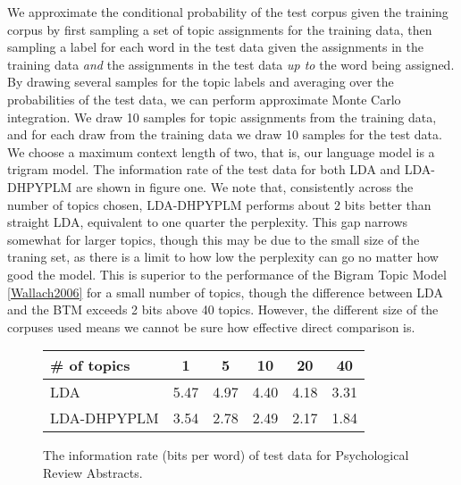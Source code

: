 We approximate the conditional probability of the test corpus given the training corpus by first sampling a set of topic assignments for the training data, then sampling a label for each word in the test data given the assignments in the training data \textit{and} the assignments in the test data \textit{up to} the word being assigned.  By drawing several samples for the topic labels and averaging over the probabilities of the test data, we can perform approximate Monte Carlo integration.  We draw 10 samples for topic assignments from the training data, and for each draw from the training data we draw 10 samples for the test data.  We choose a maximum context length of two, that is, our language model is a trigram model.  The information rate of the test data for both LDA and LDA-DHPYPLM are shown in figure one.  We note that, consistently across the number of topics chosen, LDA-DHPYPLM performs about 2 bits better than straight LDA, equivalent to one quarter the perplexity.  This gap narrows somewhat for larger topics, though this may be due to the small size of the traning set, as there is a limit to how low the perplexity can go no matter how good the model.  This is superior to the performance of the Bigram Topic Model \ref{Wallach2006} for a small number of topics, though the difference between LDA and the BTM exceeds 2 bits above 40 topics.  However, the different size of the corpuses used means we cannot be sure how effective direct comparison is.

\begin{figure}
\begin{center}
\begin{tabular}{| l || c | c | c | c | c |}
\hline
\# of topics & 1 & 5 & 10 & 20 & 40 \\
\hline
LDA & 5.47 & 4.97 & 4.40 & 4.18 & 3.31\\
\hline
LDA-DHPYPLM & 3.54 & 2.78 & 2.49 & 2.17 & 1.84\\
\hline
\end{tabular}
\caption{The information rate (bits per word) of test data for Psychological Review Abstracts.}
\end{center}
\end{figure}
